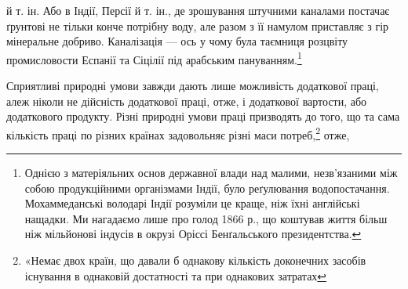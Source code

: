 й т. ін. Або в Індії, Персії й т. ін., де зрошування штучними
каналами постачає ґрунтові не тільки конче потрібну воду, але
разом з її намулом приставляє з гір мінеральне добриво. Каналізація
— ось у чому була таємниця розцвіту промисловости Еспанії
та Сіцілії під арабським пануванням.\footnote{
Однією з матеріяльних основ державної влади над малими, незв'язаними
між собою продукційними організмами Індії, було реґулювання
водопостачання. Мохаммеданські володарі Індії розуміли це краще,
ніж їхні англійські нащадки. Ми нагадаємо лише про голод 1866 р., що
коштував життя більш ніж мільйонові індусів в окрузі Оріссі Бенґальського
президентства.
}

Сприятливі природні умови завжди дають лише можливість
додаткової праці, алеж ніколи не дійсність додаткової праці,
отже, і додаткової вартости, або додаткового продукту. Різні
природні умови праці призводять до того, що та сама кількість
праці по різних країнах задовольняє різні маси потреб,\footnote{
«Немає двох країн, що давали б однакову кількість доконечних
засобів існування в однаковій достатності та при однакових затратах
} отже,

